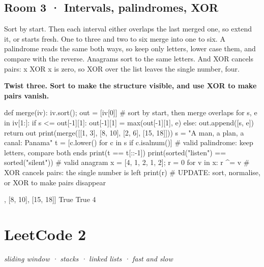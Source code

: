 \documentclass[11pt,a4paper]{report}
\begin{document}
\section*{Room 3 · Intervals, palindromes, XOR}
Sort by start. Then each interval either overlaps the last merged one, so extend it, or starts fresh. One to three and two to six merge into one to six. A palindrome reads the same both ways, so keep only letters, lower case them, and compare with the reverse. Anagrams sort to the same letters. And XOR cancels pairs: x XOR x is zero, so XOR over the list leaves the single number, four.
\begin{tcolorbox}[colback=yellow!12,colframe=orange!70!black,boxrule=0.4pt,left=4pt,right=4pt,top=2pt,bottom=2pt]\textbf{Twist three. Sort to make the structure visible, and use XOR to make pairs vanish.}\end{tcolorbox}
\begin{Code}
def merge(iv):
    iv.sort(); out = [iv[0]]                # sort by start, then merge overlaps
    for s, e in iv[1:]:
        if s <= out[-1][1]: out[-1][1] = max(out[-1][1], e)
        else: out.append([s, e])
    return out
print(merge([[1, 3], [8, 10], [2, 6], [15, 18]]))
s = "A man, a plan, a canal: Panama"
t = [c.lower() for c in s if c.isalnum()]   # valid palindrome: keep letters, compare both ends
print(t == t[::-1])
print(sorted("listen") == sorted("silent")) # valid anagram
x = [4, 1, 2, 1, 2]; r = 0
for v in x: r ^= v                          # XOR cancels pairs: the single number is left
print(r)
# UPDATE: sort, normalise, or XOR to make pairs disappear
\end{Code}
\begin{Out}
[[1, 6], [8, 10], [15, 18]]
True
True
4
\end{Out}
\chapter{LeetCode 2}
\textit{sliding window · stacks · linked lists · fast and slow}
\end{document}

